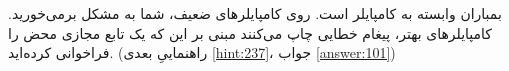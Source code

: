 \section{}
\paragraph{}\label{hint:119}
بمباران وابسته به کامپایلر است. روی کامپایلرهای ضعیف، شما به مشکل برمی‌خورید. کامپایلرهای بهتر، پیغام خطایی چاپ می‌کنند مبنی بر این که یک تابع مجازی محض را فراخوانی کرده‌اید. (راهنماییِ بعدی \ref{hint:237}، جواب \ref{answer:101})